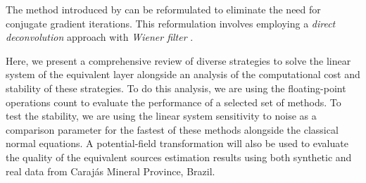 The method introduced by \citet{takahashi-etal2020,takahashi-etal2022} can be reformulated to eliminate the need for conjugate gradient iterations. 
This reformulation involves employing a \textit{direct deconvolution} approach \citep[e.g.,][p. 220]{aster_etal2019} with 
\textit{Wiener filter} \citep[e.g.,][p. 263]{gonzalez-woods2002}.

Here, we present a comprehensive review of diverse strategies to solve the linear system of the equivalent layer alongside an analysis 
of the computational cost and stability of these strategies. 
To do this analysis, we are using the floating-point operations count to evaluate the performance of 
a selected set of methods. 
To test the stability, we are using the linear system sensitivity to noise as a comparison parameter for the fastest of these methods alongside the classical normal equations. 
A potential-field transformation will also be used to evaluate the quality of the equivalent sources estimation results using both synthetic and real data from Carajás Mineral Province, Brazil.



